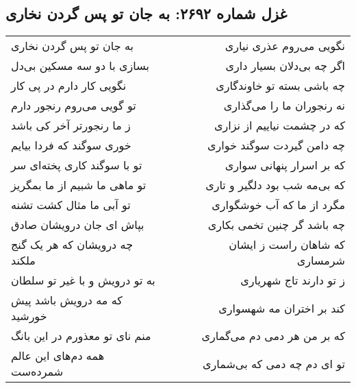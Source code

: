 \begin{center}
\section*{غزل شماره ۲۶۹۲: به جان تو پس گردن نخاری}
\label{sec:2692}
\begin{longtable}{l p{0.5cm} r}
به جان تو پس گردن نخاری
&&
نگویی می‌روم عذری نیاری
\\
بسازی با دو سه مسکین بی‌دل
&&
اگر چه بی‌دلان بسیار داری
\\
نگویی کار دارم در پی کار
&&
چه باشی بسته تو خاوندگاری
\\
تو گویی می‌روم رنجور دارم
&&
نه رنجوران ما را می‌گذاری
\\
ز ما رنجورتر آخر کی باشد
&&
که در چشمت نیاییم از نزاری
\\
خوری سوگند که فردا بیایم
&&
چه دامن گیردت سوگند خواری
\\
تو با سوگند کاری پخته‌ای سر
&&
که بر اسرار پنهانی سواری
\\
تو ماهی ما شبیم از ما بمگریز
&&
که بی‌مه شب بود دلگیر و تاری
\\
تو آبی ما مثال کشت تشنه
&&
مگرد از ما که آب خوشگواری
\\
بپاش ای جان درویشان صادق
&&
چه باشد گر چنین تخمی بکاری
\\
چه درویشان که هر یک گنج ملکند
&&
که شاهان راست ز ایشان شرمساری
\\
به تو درویش و با غیر تو سلطان
&&
ز تو دارند تاج شهریاری
\\
که مه درویش باشد پیش خورشید
&&
کند بر اختران مه شهسواری
\\
منم نای تو معذورم در این بانگ
&&
که بر من هر دمی دم می‌گماری
\\
همه دم‌های این عالم شمرده‌ست
&&
تو ای دم چه دمی که بی‌شماری
\\
\end{longtable}
\end{center}
